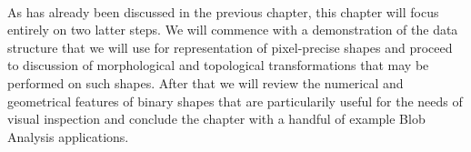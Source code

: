 \paragraph*{}
As  has already been discussed in the previous chapter, this chapter will focus entirely on two latter steps. We will commence with a demonstration of the data structure that we will use for representation of pixel-precise shapes and proceed to discussion of morphological and topological transformations that may be performed on such shapes. After that we will review the numerical and geometrical features of binary shapes that are particularily useful for the needs of visual inspection and conclude the chapter with a handful of example Blob Analysis applications.